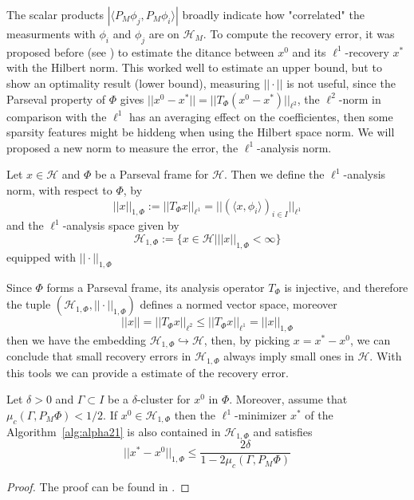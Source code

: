 The scalar products $|\langle P_M\phi_j,P_M\phi_i\rangle|$ broadly indicate how "correlated" the measurments with $\phi_i$ and $\phi_j$ are on $\mathcal{H}_M$. To compute the recovery error, it was proposed before (see \cite{Firstinpaint}) to estimate the ditance between $x^0$ and its $\ell^1$-recovery $x^*$ with the Hilbert norm. This worked well to estimate an upper bound, but to show an optimality result (lower bound), measuring $||\cdot||$ is not useful, since the Parseval property of $\Phi$ gives $||x^0-x^*||=||T_{\Phi}(x^0-x^*)||_{\ell^2}$, the $\ell^2$-norm in comparison with the $\ell^1$ has an averaging effect on the coefficientes, then some sparsity features might be hiddeng when using the Hilbert space norm. We will proposed a new norm to measure the error, the $\ell^1$-analysis norm.

\bigskip

\begin{defn}
Let $x\in\mathcal{H}$ and $\Phi$ be a Parseval frame for $\mathcal{H}$. Then we define the $\ell^1$-analysis norm, with respect to $\Phi$, by
$$
||x||_{1,\Phi}:=||T_{\Phi}x||_{\ell^1}=||(\langle x,\phi_i\rangle)_{i\in I}||_{\ell^1}
$$
and the $\ell^1$-analysis space given by 
$$
\mathcal{H}_{1,\Phi}:=\{x\in \mathcal{H}|||x||_{1,\Phi}<\infty\}
$$
equipped with $||\cdot||_{1,\Phi}$
\end{defn}

Since $\Phi$ forms a Parseval frame, its analysis operator $T_{\Phi}$ is injective, and therefore the tuple $(\mathcal{H}_{1,\Phi},||\cdot||_{1,\Phi})$ defines a normed vector space, moreover
\begin{equation}
\label{eq:alpha24}
||x||=||T_{\Phi}x||_{\ell^2}\leq ||T_{\Phi}x||_{\ell^1}=||x||_{1,\Phi}
\end{equation}
then we have the embedding $\mathcal{H}_{1,\Phi}\hookrightarrow\mathcal{H}$, then, by picking $x=x^*-x^0$, we can conclude that small recovery errors in $\mathcal{H}_{1,\Phi}$ always imply small ones in $\mathcal{H}$. With this tools we can provide a estimate of the recovery error.

\begin{thm}
\label{thm:alpha25}
Let $\delta>0$ and $\Gamma\subset I$ be a $\delta$-cluster for $x^0$ in $\Phi$. Moreover, assume that $\mu_c(\Gamma,P_M\Phi)<1/2$. If $x^0\in\mathcal{H}_{1,\Phi}$ then the $\ell^1$-minimizer $x^*$ of the Algorithm~\ref{alg:alpha21} is also contained in $\mathcal{H}_{1,\Phi}$ and satisfies 
\begin{equation}
\label{eq:alpha25}
||x^*-x^0||_{1,\Phi}\leq \frac{2\delta}{1-2\mu_c(\Gamma,P_M\Phi)}
\end{equation}
\end{thm}
\begin{proof}
The proof can be found in \cite{Firstinpaint}.
\end{proof}

